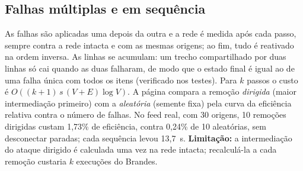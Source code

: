 \subsection{Falhas múltiplas e em sequência}\label{sec:F-RES-OPC}

As falhas são aplicadas uma depois da outra e a rede é medida após cada passo, sempre
contra a rede intacta e com as mesmas origens; ao fim, tudo é reativado na ordem inversa.
As linhas se acumulam: um trecho compartilhado por duas linhas só cai quando as duas
falharam, de modo que o estado final é igual ao de uma falha única com todos os itens
(verificado nos testes). Para $k$ passos o custo é $O((k + 1)\,s\,(V + E)\log V)$. A
página compara a remoção \emph{dirigida} (maior intermediação primeiro) com a
\emph{aleatória} (semente fixa) pela curva da eficiência relativa contra o número de
falhas. No feed real, com 30 origens, 10 remoções dirigidas custam 1,73\% de eficiência,
contra 0,24\% de 10 aleatórias, sem desconectar paradas; cada sequência levou 13,7~s.
\textbf{Limitação:} a intermediação do ataque dirigido é calculada uma vez
na rede intacta; recalculá-la a cada remoção custaria $k$ execuções do Brandes.
